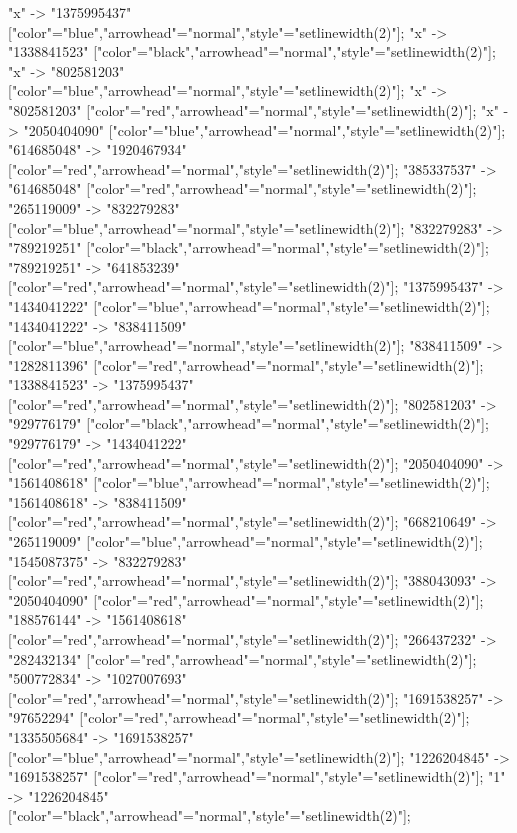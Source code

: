 {    "x" -> "1375995437" ["color"="blue","arrowhead"="normal","style"="setlinewidth(2)"];
    "x" -> "1338841523" ["color"="black","arrowhead"="normal","style"="setlinewidth(2)"];
    "x" -> "802581203" ["color"="blue","arrowhead"="normal","style"="setlinewidth(2)"];
    "x" -> "802581203" ["color"="red","arrowhead"="normal","style"="setlinewidth(2)"];
    "x" -> "2050404090" ["color"="blue","arrowhead"="normal","style"="setlinewidth(2)"];
    "614685048" -> "1920467934" ["color"="red","arrowhead"="normal","style"="setlinewidth(2)"];
    "385337537" -> "614685048" ["color"="red","arrowhead"="normal","style"="setlinewidth(2)"];
    "265119009" -> "832279283" ["color"="blue","arrowhead"="normal","style"="setlinewidth(2)"];
    "832279283" -> "789219251" ["color"="black","arrowhead"="normal","style"="setlinewidth(2)"];
    "789219251" -> "641853239" ["color"="red","arrowhead"="normal","style"="setlinewidth(2)"];
    "1375995437" -> "1434041222" ["color"="blue","arrowhead"="normal","style"="setlinewidth(2)"];
    "1434041222" -> "838411509" ["color"="blue","arrowhead"="normal","style"="setlinewidth(2)"];
    "838411509" -> "1282811396" ["color"="red","arrowhead"="normal","style"="setlinewidth(2)"];
    "1338841523" -> "1375995437" ["color"="red","arrowhead"="normal","style"="setlinewidth(2)"];
    "802581203" -> "929776179" ["color"="black","arrowhead"="normal","style"="setlinewidth(2)"];
    "929776179" -> "1434041222" ["color"="red","arrowhead"="normal","style"="setlinewidth(2)"];
    "2050404090" -> "1561408618" ["color"="blue","arrowhead"="normal","style"="setlinewidth(2)"];
    "1561408618" -> "838411509" ["color"="red","arrowhead"="normal","style"="setlinewidth(2)"];
    "668210649" -> "265119009" ["color"="blue","arrowhead"="normal","style"="setlinewidth(2)"];
    "1545087375" -> "832279283" ["color"="red","arrowhead"="normal","style"="setlinewidth(2)"];
    "388043093" -> "2050404090" ["color"="red","arrowhead"="normal","style"="setlinewidth(2)"];
    "188576144" -> "1561408618" ["color"="red","arrowhead"="normal","style"="setlinewidth(2)"];
    "266437232" -> "282432134" ["color"="red","arrowhead"="normal","style"="setlinewidth(2)"];
    "500772834" -> "1027007693" ["color"="red","arrowhead"="normal","style"="setlinewidth(2)"];
    "1691538257" -> "97652294" ["color"="red","arrowhead"="normal","style"="setlinewidth(2)"];
    "1335505684" -> "1691538257" ["color"="blue","arrowhead"="normal","style"="setlinewidth(2)"];
    "1226204845" -> "1691538257" ["color"="red","arrowhead"="normal","style"="setlinewidth(2)"];
    "1" -> "1226204845" ["color"="black","arrowhead"="normal","style"="setlinewidth(2)"];
}